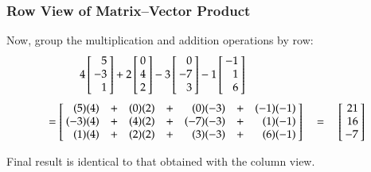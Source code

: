 \documentclass[10pt]{beamer}
\begin{document}
\begin{frame}
\frametitle{Row View of Matrix--Vector Product}

Now, group the multiplication and addition operations by row:
\begin{equation*}
      4\left[\negthickspace\begin{array}{r}  5 \\ -3 \\  1 \end{array}\negthickspace\right]
    + 2\left[\negthickspace\begin{array}{r}  0 \\  4 \\  2 \end{array}\negthickspace\right]
    - 3\left[\negthickspace\begin{array}{r}  0 \\ -7 \\  3 \end{array}\negthickspace\right]
    - 1\left[\negthickspace\begin{array}{r} -1 \\  1 \\  6 \end{array}\negthickspace\right]
    \qquad\qquad\qquad\qquad
\end{equation*}
\begin{equation*}
    \hfill
    = \left[\negthickspace
          \begin{array}{rcrcrcr}
                     (5)(4)  & + & (0)(2) & + & (0)(-3)  & + & (-1)(-1) \\
                     (-3)(4) & + & (4)(2) & + & (-7)(-3) & + & (1)(-1)  \\
                     (1)(4)  & + & (2)(2) & + & (3)(-3)  & + & (6)(-1)  \end{array}\negthickspace\right]
    \quad=\quad
    \left[\negthickspace
          \begin{array}{r}  21 \\  16  \\ -7 \end{array}\negthickspace\right]
\end{equation*}

\vspace{3ex}
Final result is identical to that obtained with the column view.

\end{frame}
\end{document}
